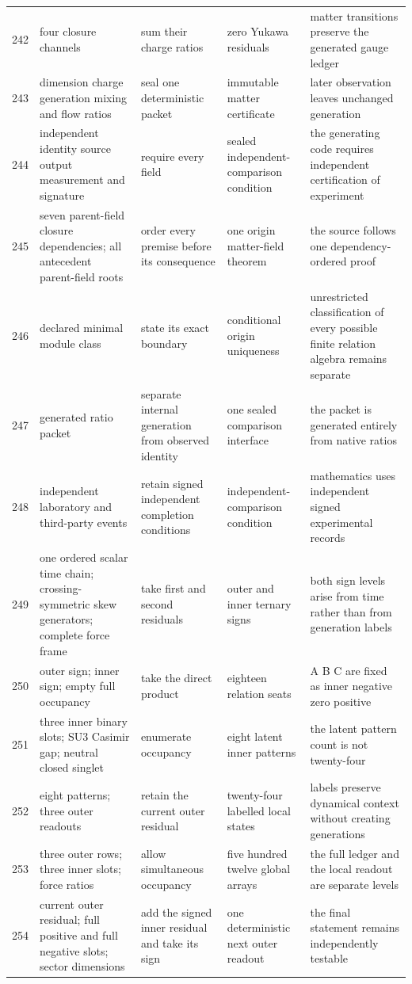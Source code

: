 \documentclass[11pt]{article}
\numberwithin{equation}{section}
\theoremstyle{remark}
\begin{document}
\begin{landscape}
\begin{longtable}{p{0.65cm}p{3.5cm}p{4.0cm}p{4.0cm}p{4.6cm}}
242&four closure channels&sum their charge ratios&zero Yukawa residuals&matter transitions preserve the generated gauge ledger\\
243&dimension charge generation mixing and flow ratios&seal one deterministic packet&immutable matter certificate&later observation leaves unchanged generation\\
244&independent identity source output measurement and signature&require every field&sealed independent-comparison condition&the generating code requires independent certification of experiment\\
245&seven parent-field closure dependencies; all antecedent parent-field roots&order every premise before its consequence&one origin matter-field theorem&the source follows one dependency-ordered proof\\
246&declared minimal module class&state its exact boundary&conditional origin uniqueness&unrestricted classification of every possible finite relation algebra remains separate\\
247&generated ratio packet&separate internal generation from observed identity&one sealed comparison interface&the packet is generated entirely from native ratios\\
248&independent laboratory and third-party events&retain signed independent completion conditions&independent-comparison condition&mathematics uses independent signed experimental records\\
249&one ordered scalar time chain; crossing-symmetric skew generators; complete force frame&take first and second residuals&outer and inner ternary signs&both sign levels arise from time rather than from generation labels\\
250&outer sign; inner sign; empty full occupancy&take the direct product&eighteen relation seats&A B C are fixed as inner negative zero positive\\
251&three inner binary slots; SU3 Casimir gap; neutral closed singlet&enumerate occupancy&eight latent inner patterns&the latent pattern count is not twenty-four\\
252&eight patterns; three outer readouts&retain the current outer residual&twenty-four labelled local states&labels preserve dynamical context without creating generations\\
253&three outer rows; three inner slots; force ratios&allow simultaneous occupancy&five hundred twelve global arrays&the full ledger and the local readout are separate levels\\
254&current outer residual; full positive and full negative slots; sector dimensions&add the signed inner residual and take its sign&one deterministic next outer readout&the final statement remains independently testable\\

\end{longtable}
\end{landscape}
\end{document}
